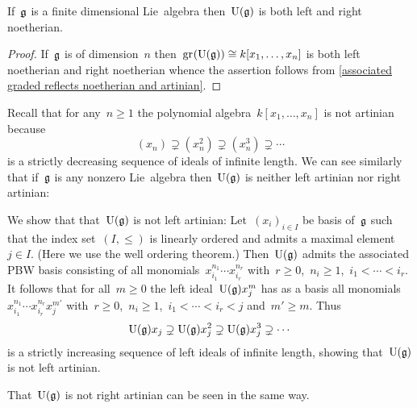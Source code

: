 \begin{corollary}
  If~$\mathfrak{g}$ is a finite dimensional Lie~algebra then~$\operatorname{U}(\mathfrak{g})$ is both left and right noetherian.
\end{corollary}

\begin{proof}
  If~$\mathfrak{g}$ is of dimension~$n$ then~$\gr(\Univ(\glie)) \cong k[x_1, \dotsc, x_n]$ is both left noetherian and right noetherian whence the assertion follows from \cref{associated graded reflects noetherian and artinian}.
\end{proof}

\begin{remark}
  Recall that for any~$n \geq 1$ the polynomial algebra~$k[x_1, \dotsc, x_n]$ is not artinian because
  \[
    (x_n)
    \supsetneq
    (x_n^2)
    \supsetneq
    (x_n^3)
    \supsetneq
    \dotsb
  \]
  is a strictly decreasing sequence of ideals of infinite length.
  We can see similarly that if~$\mathfrak{g}$ is any nonzero Lie~algebra then~$\operatorname{U}(\mathfrak{g})$ is neither left artinian nor right artinian:
  
  We show that that~$\operatorname{U}(\mathfrak{g})$ is not left artinian:
  Let~$(x_i)_{i \in I}$ be basis of~$\mathfrak{g}$ such that the index set~$(I, \leq)$ is linearly ordered and admits a maximal element~$j \in I$.
  (Here we use the well ordering theorem.)
  Then~$\operatorname{U}(\mathfrak{g})$ admits the associated PBW basis consisting of all monomials~$x_{i_1}^{n_1} \dotsm x_{i_r}^{n_r}$ with~$r \geq 0$,~$n_i \geq 1$,~$i_1 < \dotsb < i_r$.
  It follows that for all~$m \geq 0$ the left ideal~$\operatorname{U}(\mathfrak{g}) x_j^m$ has as a basis all monomials~$x_{i_1}^{n_1} \dotsm x_{i_r}^{n_r} x_j^{m'}$ with~$r \geq 0$,~$n_i \geq 1$,~$i_1 < \dotsb < i_r < j$ and~$m' \geq m$.
  Thus
  \[
    \operatorname{U}(\mathfrak{g}) x_j
    \supsetneq
    \operatorname{U}(\mathfrak{g}) x_j^2
    \supsetneq
    \operatorname{U}(\mathfrak{g}) x_j^3
    \supsetneq
    \dotsb
  \]
  is a strictly increasing sequence of left ideals of infinite length, showing that~$\operatorname{U}(\mathfrak{g})$ is not left artinian.
  
  That~$\operatorname{U}(\mathfrak{g})$ is not right artinian can be seen in the same way.
\end{remark}


